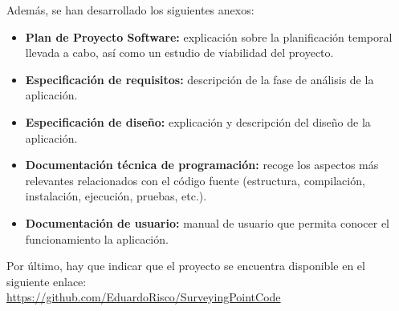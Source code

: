 Además, se han desarrollado los siguientes anexos:

\begin{itemize}
	\item \textbf {Plan de Proyecto Software:} explicación sobre la planificación temporal llevada a cabo, así como un estudio de viabilidad del proyecto.
	\item \textbf {Especificación de requisitos:} descripción de la fase de análisis de la aplicación.
	\item \textbf {Especificación de diseño:} explicación y descripción del diseño de la aplicación.
	\item \textbf {Documentación técnica de programación:} recoge los aspectos más relevantes relacionados con el código fuente (estructura, compilación, instalación, ejecución, pruebas, etc.).
	\item \textbf {Documentación de usuario:} manual de usuario que permita conocer el funcionamiento la aplicación.
\end{itemize}

Por último, hay que indicar que el proyecto se encuentra disponible en el siguiente enlace:\\
 \url{https://github.com/EduardoRisco/SurveyingPointCode}